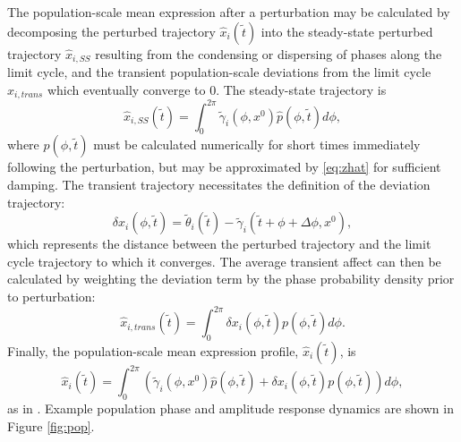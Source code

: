 The population-scale mean expression after a perturbation may be calculated by decomposing the perturbed trajectory $\hat{x}_i(\tilde{t})$ into the steady-state perturbed trajectory  $\hat{x}_{i,SS}$ resulting from the condensing or dispersing of phases along the limit cycle, and the transient population-scale deviations from the limit cycle $\hat{x}_{i,trans}$ which eventually converge to $0$. 
The steady-state trajectory is 
\begin{equation}
    \hat{x}_{i,SS}(\tilde{t}) = \int_{0}^{2\pi} \tilde{\gamma}_i(\phi, x^0)\hat{p}(\phi,\tilde{t})d\phi,
\end{equation}
where $\hat{p}(\phi,\tilde{t})$ must be calculated numerically for short times immediately following the perturbation, but may be approximated by \eqref{eq:zhat} for sufficient damping.
The transient trajectory necessitates the definition of the deviation trajectory:
\begin{equation}
    \delta x_i(\phi,\tilde{t}) = \tilde{\theta}_i(\tilde{t})-\tilde{\gamma}_i(\tilde{t}+\phi+\Delta\phi, x^0),
\end{equation}
which represents the distance between the perturbed trajectory and the limit cycle trajectory to which it converges.
The average transient affect can then be calculated by weighting the deviation term by the phase probability density prior to perturbation:
\begin{equation}
    \hat{x}_{i,trans}(\tilde{t}) = \int_0^{2\pi} \delta x_i(\phi,\tilde{t})p(\phi,\tilde{t})d\phi.
\end{equation}
Finally, the population-scale mean expression profile, $\hat{x}_i(\tilde{t})$, is
\begin{equation}
    \hat{x}_i(\tilde{t}) = \int_{0}^{2\pi} \left( \tilde\gamma_i(\phi, x^0)\hat{p}(\phi,\tilde{t}) + \delta x_i(\phi,\tilde{t})p(\phi,\tilde{t}) \right)d\phi,
\end{equation}
as in \cite{StJohn2014b}.
Example population phase and amplitude response dynamics are shown in Figure \ref{fig:pop}.

